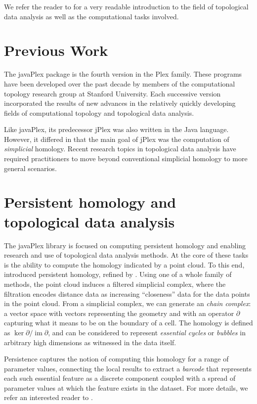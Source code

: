 We refer the reader to \cite{Carlsson_09} for a very readable introduction to the field of topological data analysis as well as the computational tasks involved.

\section{Previous Work}

The javaPlex package is the fourth version in the Plex family. These programs have been developed over the past decade by members of the computational topology research group at Stanford University. Each successive version incorporated the results of new advances in the relatively quickly developing fields of computational topology and topological data analysis.

Like javaPlex, its predecessor jPlex was also written in the Java language. However, it differed in that the main goal of jPlex was the computation of \emph{simplicial} homology. Recent research topics in topological data analysis have required practitioners to move beyond conventional simplicial homology to more general scenarios.

\section{Persistent homology and topological data analysis}
\label{sec:pers-homol-topol}

The javaPlex library is focused on computing persistent homology and
enabling research and use of topological data analysis methods. At the
core of these tasks is the ability to compute the homology indicated
by a point cloud. To this end, \cite{ELZ_02} introduced persistent homology, refined by
\cite{Carlsson_04}. Using one of a whole family of methods, the point
cloud induces a filtered simplicial complex, where the filtration
encodes distance data as increasing ``closeness'' data for the data
points in the point cloud. From a simplicial complex, we can generate
an \emph{chain complex}: a vector space with vectors representing the
geometry and with an operator $\partial$ capturing what it means to be on the
boundary of a cell. The homology is defined as
$\ker\partial/\mathop{\mathrm{im}}\partial$, and can be considered to represent
\emph{essential cycles} or \emph{bubbles} in arbitrary high dimensions
as witnessed in the data itself.

Persistence captures the notion of computing this homology for a range
of parameter values, connecting the local results to extract a
\emph{barcode} that represents each such essential feature as a
discrete component coupled with a spread of parameter values at which
the feature exists in the dataset. For more details, we refer an
interested reader to \cite{Carlsson_09}.

